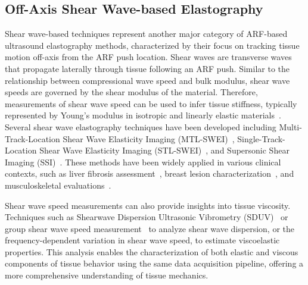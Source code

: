 \subsection{Off-Axis Shear Wave-based Elastography}
\label{sec:about_offaxis}


Shear wave-based techniques represent another major category of ARF-based ultrasound elastography methods, characterized by their focus on tracking tissue motion off-axis from the ARF push location. Shear waves are transverse waves that propagate laterally through tissue following an ARF push. Similar to the relationship between compressional wave speed and bulk modulus, shear wave speeds are governed by the shear modulus of the material. Therefore, measurements of shear wave speed can be used to infer tissue stiffness, typically represented by Young's modulus in isotropic and linearly elastic materials~\cite{sarvazyan_Shear_1998}. Several shear wave elastography techniques have been developed including Multi-Track-Location Shear Wave Elasticity Imaging (MTL-SWEI)~\cite{sarvazyan_Shear_1998,nightingale_Shearwave_2003}, Single-Track-Location Shear Wave Elasticity Imaging (STL-SWEI)~\cite{elegbe_Single_2013,hollender_Single_2015}, and Supersonic Shear Imaging (SSI)~\cite{bercoff_Supersonic_2004}. These methods have been widely applied in various clinical contexts, such as liver fibrosis assessment~\cite{frulio_Evaluation_2013,nenadic_Ultrasound_2019}, breast lesion characterization~\cite{balleyguier_Breast_2013}, and musculoskeletal evaluations~\cite{ryu_Current_2017}.

Shear wave speed measurements can also provide insights into tissue viscosity. Techniques such as Shearwave Dispersion Ultrasonic Vibrometry (SDUV)~\cite{chen_Shearwave_2009} or group shear wave speed measurement~\cite{kim_Prediction_2024,rouze_Characterization_2018,yuan_Ultrasound_2024} to analyze shear wave dispersion, or the frequency-dependent variation in shear wave speed, to estimate viscoelastic properties. This analysis enables the characterization of both elastic and viscous components of tissue behavior using the same data acquisition pipeline, offering a more comprehensive understanding of tissue mechanics.

